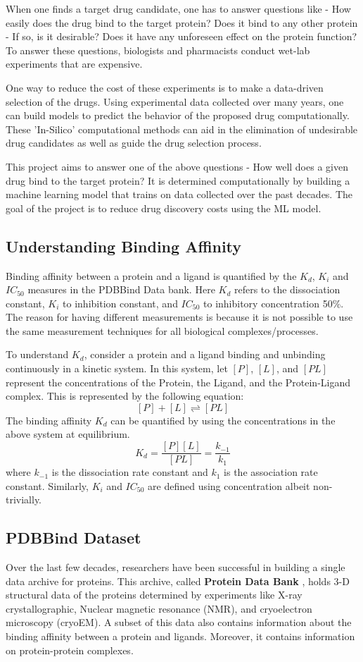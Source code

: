 \documentclass[11pt]{article}
\begin{document}
When one finds a target drug candidate,  one has to answer questions like - How easily does the drug bind to the target protein? Does it bind to any other protein - If so, is it desirable? Does it have any unforeseen effect on the protein function?  To answer these questions, biologists and pharmacists conduct wet-lab experiments that are expensive.

One way to reduce the cost of these experiments is to make a data-driven selection of the drugs.  Using experimental data collected over many years, one can build models to predict the behavior of the proposed drug computationally.  These 'In-Silico' computational methods can aid in the elimination of undesirable drug candidates as well as guide the drug selection process.

This project aims to answer one of the above questions - How well does a given drug bind to the target protein? It is determined computationally by building a machine learning model that trains on data collected over the past decades. The goal of the project is to reduce drug discovery costs using the ML model. 

\subsection{Understanding Binding Affinity}
Binding affinity between a protein and a ligand is quantified by the $K_d$, $K_i$ and $IC_{50}$ measures in the PDBBind Data bank.
Here $K_d$ refers to the dissociation constant, $K_i$ to inhibition constant, and $IC_{50}$ to 
inhibitory concentration 50\%.
The reason for having different measurements is because it is not possible to use the same measurement techniques
for all biological complexes/processes.

To understand $K_d$, consider a protein and a ligand binding and unbinding continuously in a kinetic system.
In this system, let $[P]$, $[L]$, and $[PL]$ represent the concentrations of the Protein, the Ligand, and the Protein-Ligand complex.
This is represented by the following equation:
$$[P] + [L] \rightleftharpoons [PL]$$
The binding affinity $K_d$ can be quantified by using the concentrations in the above system at equilibrium.
$$K_d = \frac{[P][L]}{[PL]} = \frac{k_{-1}}{k_1}$$
where $k_{-1}$ is the dissociation rate constant and $k_1$ is the association rate constant.
Similarly, $K_i$ and $IC_{50}$ are defined using concentration albeit non-trivially. 
\cite{binding_affinity_description}

\subsection{PDBBind Dataset}
Over the last few decades, researchers have been successful in building a single data archive for proteins. This archive, called \textbf{Protein Data Bank} \cite{pdb_homepage}, holds 3-D structural data of the proteins determined by experiments like X-ray crystallographic, Nuclear magnetic resonance (NMR), and cryoelectron microscopy (cryoEM).  A subset of this data also contains information about the binding affinity between a protein and ligands. Moreover, it contains information on protein-protein complexes.
\cite{pdbank_history}
\end{document}
